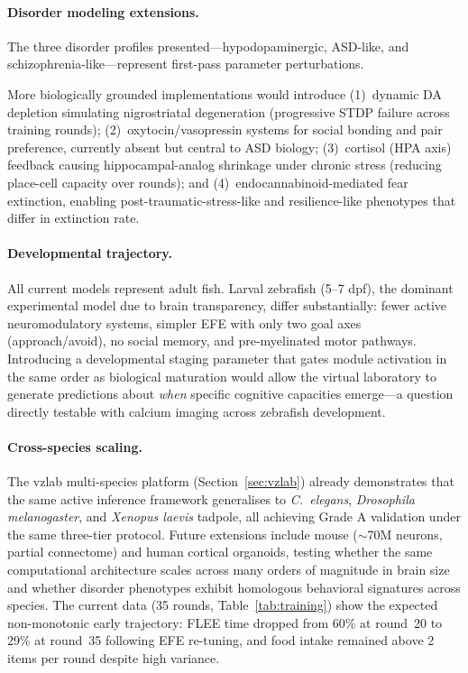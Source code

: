 \documentclass[12pt]{article}
\begin{document}
\paragraph{Disorder modeling extensions.}
\begin{sloppypar}
The three disorder profiles presented---hypodopaminergic, ASD-like, and
schizophrenia-like---represent first-pass parameter perturbations.
\end{sloppypar}
More biologically grounded implementations would introduce
(1)~dynamic DA depletion simulating nigrostriatal degeneration
(progressive STDP failure across training rounds);
(2)~oxytocin/vasopressin systems for social bonding and pair preference,
currently absent but central to ASD biology;
(3)~cortisol (HPA axis) feedback causing hippocampal-analog shrinkage
under chronic stress (reducing place-cell capacity over rounds);
and (4)~endocannabinoid-mediated fear extinction, enabling
post-traumatic-stress-like and resilience-like phenotypes that
differ in extinction rate.

\paragraph{Developmental trajectory.}
All current models represent adult fish.
Larval zebrafish (5--7 dpf), the dominant experimental model due to
brain transparency, differ substantially: fewer active neuromodulatory
systems, simpler EFE with only two goal axes (approach/avoid),
no social memory, and pre-myelinated motor pathways.
Introducing a developmental staging parameter that gates module
activation in the same order as biological maturation would allow the
virtual laboratory to generate predictions about \emph{when} specific
cognitive capacities emerge---a question directly testable with
calcium imaging across zebrafish development.

\paragraph{Cross-species scaling.}
\begin{sloppypar}
The vzlab multi-species platform (Section~\ref{sec:vzlab}) already
demonstrates that the same active inference framework generalises
to \textit{C.~elegans}, \textit{Drosophila melanogaster}, and
\textit{Xenopus laevis} tadpole, all achieving Grade A validation
under the same three-tier protocol.
Future extensions include mouse (${\sim}$70M neurons, partial connectome)
and human cortical organoids, testing whether the same computational
architecture scales across many orders of magnitude in brain size
and whether disorder phenotypes exhibit homologous behavioral
signatures across species.
The current data (35 rounds, Table~\ref{tab:training}) show the
expected non-monotonic early trajectory: FLEE time dropped from 60\%
at round~20 to 29\% at round~35 following EFE re-tuning,
and food intake remained above 2 items per round despite high variance.
\end{sloppypar}
\end{document}
